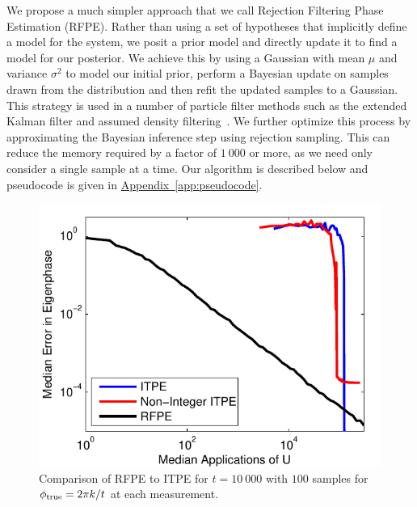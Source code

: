 \documentclass[aps,pra,amsmath,twocolumn,amssymb,superscriptaddress]{revtex4-1}
\newcommand{\app}[1]{\hyperref[app:#1]{Appendix~\ref*{app:#1}}}
\begin{document}
We propose a much simpler approach that we call Rejection Filtering Phase
Estimation (RFPE). Rather than using a set of hypotheses that implicitly
define a model for the system, we posit a prior model and directly update it
to find a model for our posterior.  We achieve this by using a
Gaussian with mean $\mu$ and variance $\sigma^2$ to model our initial prior, perform a Bayesian update on samples
drawn from the distribution and then refit the updated samples to a Gaussian.
This strategy is used in a number of particle filter methods such as the extended Kalman filter and assumed density
filtering~\cite{haykin2004kalman,opper1998bayesian}.  We further optimize
this process by approximating the Bayesian inference step using rejection
sampling.  This can reduce the memory required by a factor of $1~000$ or more,
as we need only consider a single sample at a time. Our algorithm is described
below and pseudocode is given in \app{pseudocode}.

\begin{figure}[t!]
    \begin{centering}
        \includegraphics[width=0.723\linewidth]{ITPEcmp.pdf}
    \end{centering}
    \caption{\label{fig:ITPEcmp}
     Comparison of RFPE to ITPE for $t=10~000$ with $100$ samples for $\phi_{\rm true} = 2\pi k/t$ at each measurement.  
    }
\end{figure}
\end{document}
